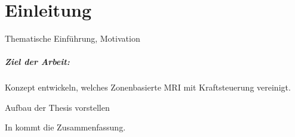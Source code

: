 \chapter{Einleitung}\label{ch:introduction}
Thematische Einführung, Motivation

\paragraph{Ziel der Arbeit:} Konzept entwickeln, welches Zonenbasierte MRI mit Kraftsteuerung vereinigt.

Aufbau der Thesis vorstellen

In kommt die Zusammenfassung.
